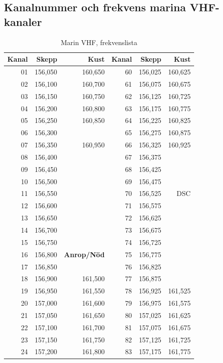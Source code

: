 {\subsection{Kanalnummer och frekvens marina VHF-kanaler}

\begin{longtable}{rrr|rrr}
\caption{Marin VHF, frekvenslista} \\
\textbf{Kanal} & \textbf{Skepp} & \textbf{Kust} &
\textbf{Kanal} & \textbf{Skepp} & \textbf{Kust} \\ \hline \endhead
01 & 156,050 & 160,650 & 60 & 156,025 & 160,625 \\
02 & 156,100 & 160,700 & 61 & 156,075 & 160,675 \\
03 & 156,150 & 160,750 & 62 & 156,125 & 160,725 \\
04 & 156,200 & 160,800 & 63 & 156,175 & 160,775 \\
05 & 156,250 & 160,850 & 64 & 156,225 & 160,825 \\
06 & 156,300 &         & 65 & 156,275 & 160,875 \\
07 & 156,350 & 160,950 & 66 & 156,325 & 160,925 \\
08 & 156,400 &         & 67 & 156,375 & \\
09 & 156,450 &         & 68 & 156,425 & \\
10 & 156,500 &         & 69 & 156,475 & \\
11 & 156,550 &         & 70 & 156,525 & DSC \\
12 & 156,600 &         & 71 & 156,575 & \\
13 & 156,650 &         & 72 & 156,625 & \\
14 & 156,700 &         & 73 & 156,675 & \\
15 & 156,750 &         & 74 & 156,725 & \\
16 & 156,800 & \bf Anrop/Nöd    & 75 & 156,775 & \\
17 & 156,850 &         & 76 & 156,825 & \\
18 & 156,900 & 161,500 & 77 & 156,875 & \\
19 & 156,950 & 161,550 & 78 & 156,925 & 161,525 \\
20 & 157,000 & 161,600 & 79 & 156,975 & 161,575 \\
21 & 157,050 & 161,650 & 80 & 157,025 & 161,625 \\
22 & 157,100 & 161,700 & 81 & 157,075 & 161,675 \\
23 & 157,150 & 161,750 & 82 & 157,125 & 161,725 \\
24 & 157,200 & 161,800 & 83 & 157,175 & 161,775 \\

\end{longtable}}
